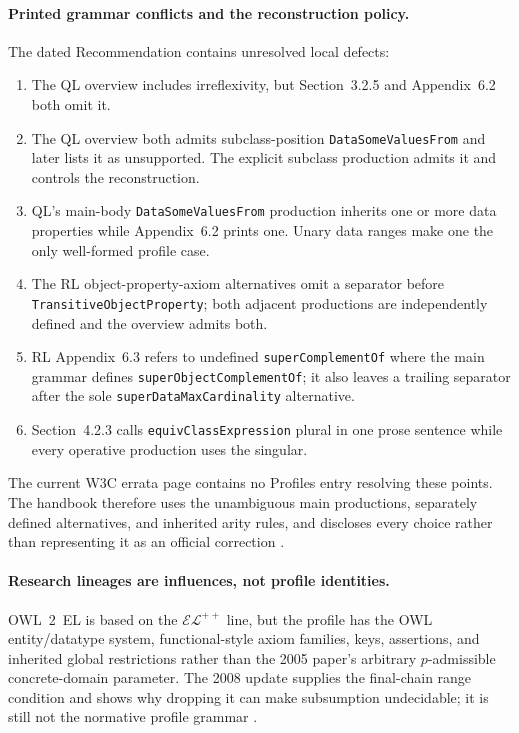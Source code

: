 \paragraph{Printed grammar conflicts and the reconstruction policy.}
The dated Recommendation contains unresolved local defects:
\begin{enumerate}
\item The QL overview includes irreflexivity, but Section~3.2.5 and
Appendix~6.2 both omit it.
\item The QL overview both admits subclass-position
\texttt{DataSomeValuesFrom} and later lists it as unsupported.  The explicit
subclass production admits it and controls the reconstruction.
\item QL's main-body \texttt{DataSomeValuesFrom} production inherits one or
more data properties while Appendix~6.2 prints one.  Unary data ranges make one
the only well-formed profile case.
\item The RL object-property-axiom alternatives omit a separator before
\texttt{TransitiveObjectProperty}; both adjacent productions are independently
defined and the overview admits both.
\item RL Appendix~6.3 refers to undefined \texttt{superComplementOf} where the
main grammar defines \texttt{superObjectComplementOf}; it also leaves a
trailing separator after the sole \texttt{superDataMaxCardinality} alternative.
\item Section~4.2.3 calls \texttt{equivClassExpression} plural in one prose
sentence while every operative production uses the singular.
\end{enumerate}
The current W3C errata page contains no Profiles entry resolving these points.
The handbook therefore uses the unambiguous main productions, separately
defined alternatives, and inherited arity rules, and discloses every choice
rather than representing it as an official correction
\cite{W3COWL2Errata}.

\paragraph{Research lineages are influences, not profile identities.}
OWL~2~EL is based on the \(\mathcal{EL}^{++}\) line, but the profile has the OWL
entity/datatype system, functional-style axiom families, keys, assertions, and
inherited global restrictions rather than the 2005 paper's arbitrary
\(p\)-admissible concrete-domain parameter.  The 2008 update supplies the
final-chain range condition and shows why dropping it can make subsumption
undecidable; it is still not the normative profile grammar
\cite{BaaderBrandtLutz2005,BaaderBrandtLutz2008,W3COWL2Profiles2012}.

